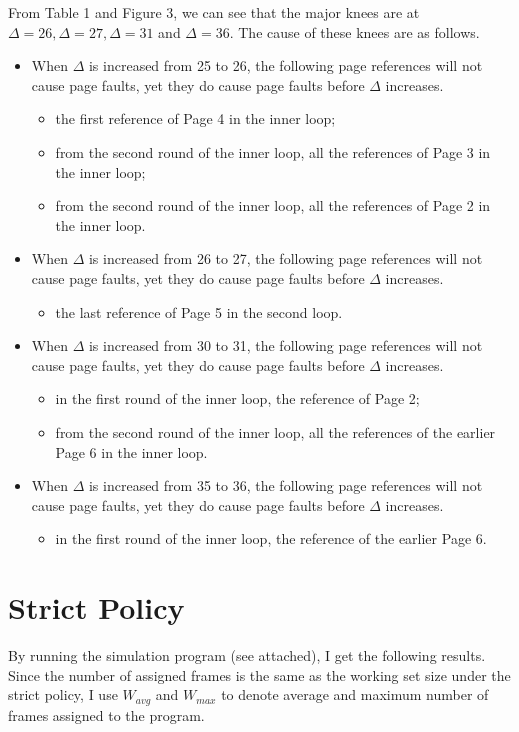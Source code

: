 \documentclass[12pt,letterpaper]{article}
\begin{document}
From Table 1 and Figure 3, we can see that the major knees are at $\Delta=26, \Delta=27, \Delta=31$ and $\Delta=36$. The cause of these knees are as follows.
\begin{itemize}
\item When $\Delta$ is increased from 25 to 26, the following page references will not cause page faults, yet they do cause page faults before $\Delta$ increases. 
\begin{itemize}
\item the first reference of Page 4 in the inner loop;
\item from the second round of the inner loop, all the references of Page 3 in the inner loop;
\item from the second round of the inner loop, all the references of Page 2 in the inner loop.
\end{itemize}
\item When $\Delta$ is increased from 26 to 27, the following page references will not cause page faults, yet they do cause page faults before $\Delta$ increases.
\begin{itemize}
\item the last reference of Page 5 in the second loop.
\end{itemize}
\item When $\Delta$ is increased from 30 to 31, the following page references will not cause page faults, yet they do cause page faults before $\Delta$ increases.
\begin{itemize}
\item in the first round of the inner loop, the reference of Page 2;
\item from the second round of the inner loop, all the references of the earlier Page 6 in the inner loop.
\end{itemize}
\item When $\Delta$ is increased from 35 to 36, the following page references will not cause page faults, yet they do cause page faults before $\Delta$ increases.
\begin{itemize}
\item in the first round of the inner loop, the reference of the earlier Page 6.
\end{itemize}
\end{itemize}

\section{Strict Policy}
By running the simulation program (see attached), I get the following results. Since the number of assigned frames is the same as the working set size under the strict policy, I use $W_{avg}$ and $W_{max}$ to denote average and maximum number of frames assigned to the program.
\end{document}
